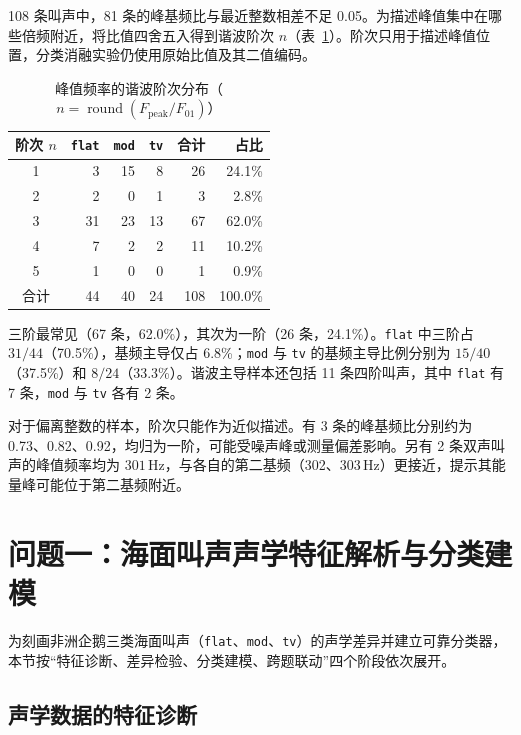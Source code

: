 \documentclass{apmcmthesis}
\begin{document}
108 条叫声中，81 条的峰基频比与最近整数相差不足 0.05。为描述峰值集中在哪些倍频附近，将比值四舍五入得到谐波阶次 $n$（表~\ref{tab:prep_order}）。阶次只用于描述峰值位置，分类消融实验仍使用原始比值及其二值编码。
\begin{table}[htbp]
\centering
\caption{峰值频率的谐波阶次分布（$n=\operatorname{round}(F_{\mathrm{peak}}/F_{01})$）}\label{tab:prep_order}
\begin{tabular*}{.84\linewidth}{@{\extracolsep{\fill}}crrrrr@{}}
\toprule
阶次 $n$ & \texttt{flat} & \texttt{mod} & \texttt{tv} & 合计 & 占比 \\
\midrule
1 & 3 & 15 & 8 & 26 & 24.1\% \\
2 & 2 & 0 & 1 & 3 & 2.8\% \\
3 & 31 & 23 & 13 & 67 & 62.0\% \\
4 & 7 & 2 & 2 & 11 & 10.2\% \\
5 & 1 & 0 & 0 & 1 & 0.9\% \\
\midrule
合计 & 44 & 40 & 24 & 108 & 100.0\% \\
\bottomrule
\end{tabular*}
\end{table}

三阶最常见（67 条，62.0\%），其次为一阶（26 条，24.1\%）。\texttt{flat} 中三阶占 $31/44$（70.5\%），基频主导仅占 6.8\%；\texttt{mod} 与 \texttt{tv} 的基频主导比例分别为 $15/40$（37.5\%）和 $8/24$（33.3\%）。谐波主导样本还包括 11 条四阶叫声，其中 \texttt{flat} 有 7 条，\texttt{mod} 与 \texttt{tv} 各有 2 条。

对于偏离整数的样本，阶次只能作为近似描述。有 3 条的峰基频比分别约为 0.73、0.82、0.92，均归为一阶，可能受噪声峰或测量偏差影响。另有 2 条双声叫声的峰值频率均为 $301\,\mathrm{Hz}$，与各自的第二基频（302、$303\,\mathrm{Hz}$）更接近，提示其能量峰可能位于第二基频附近。


\FloatBarrier
\setcounter{table}{\previousTableCount}
\endgroup

\section{问题一：海面叫声声学特征解析与分类建模}

为刻画非洲企鹅三类海面叫声（\texttt{flat}、\texttt{mod}、\texttt{tv}）的声学差异并建立可靠分类器，本节按``特征诊断、差异检验、分类建模、跨题联动''四个阶段依次展开。

\subsection{声学数据的特征诊断}
\end{document}

